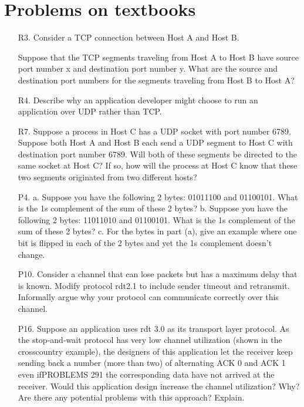 \documentclass[]{article}
\begin{document}
\section{Problems on textbooks}
\begin{enumerate}
	\item[R3.] Consider a TCP connection between Host A and Host B. 
	
	Suppose that the
	TCP segments traveling from Host A to Host B have source port number x and destination port number y. What are the source and destination port numbers for the segments traveling from Host B to Host A?
	
	\item[R4.] Describe why an application developer might choose to run an application over UDP rather than TCP.
	
	\item[R7.] Suppose a process in Host C has a UDP socket with port number 6789. Suppose both Host A and Host B each send a UDP segment to Host C with destination port number 6789. Will both of these segments be directed to the same socket at Host C? If so, how will the process at Host C know that these two segments originated from two different hosts?
	
	\item[P4.] 
	\subitem a. Suppose you have the following 2 bytes: 01011100 and 01100101. What is the 1s complement of the sum of these 2 bytes?
	\subitem b. Suppose you have the following 2 bytes: 11011010 and 01100101. What is the 1s complement of the sum of these 2 bytes?
	\subitem c. For the bytes in part (a), give an example where one bit is flipped in each	of the 2 bytes and yet the 1s complement doesn’t change.
	
	\item[P10.] Consider a channel that can lose packets but has a maximum delay that is known. Modify protocol rdt2.1 to include sender timeout and retransmit.	Informally argue why your protocol can communicate correctly over this	channel.
	
	\item[P16.] Suppose an application uses rdt 3.0 as its transport layer protocol. As the stop-and-wait protocol has very low channel utilization (shown in the crosscountry example), the designers of this application let the receiver keep sending back a number (more than two) of alternating ACK 0 and ACK 1 even ifPROBLEMS 291	the corresponding data have not arrived at the receiver. Would this application design increase the channel utilization? Why? Are there any potential problems with this approach? Explain.
	

\end{enumerate}
\end{document}

